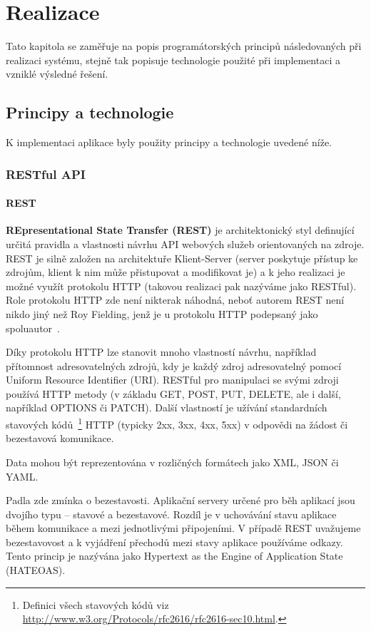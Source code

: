 \documentclass[thesis=M,czech]{FITthesis}[2014/05/07]
\begin{document}
\chapter{Realizace}
\label{chap:impl}

Tato kapitola se zaměřuje na popis programátorských principů následovaných při realizaci systému, stejně tak popisuje technologie použité při implementaci a vzniklé výsledné řešení.

\section{Principy a technologie}
\label{sec:sysanalys}

K implementaci aplikace byly použity principy a technologie uvedené níže.

\subsection{RESTful API}

\subsubsection{REST}
\textbf{REpresentational State Transfer (REST)} je architektonický styl definující určitá pravidla a vlastnosti návrhu API webových služeb orientovaných na zdroje. REST je silně založen na architektuře Klient-Server (server poskytuje přístup ke zdrojům, klient k nim může přistupovat a modifikovat je) a k jeho realizaci je možné využít protokolu HTTP (takovou realizaci pak nazýváme jako RESTful). Role protokolu HTTP zde není nikterak náhodná, neboť autorem REST není nikdo jiný než Roy Fielding, jenž je u protokolu HTTP podepsaný jako spoluautor~\cite{Fielding:2000:ASD:932295}. 

Díky protokolu HTTP lze stanovit mnoho vlastností návrhu, například přítomnost adresovatelných zdrojů, kdy je každý zdroj adresovatelný pomocí Uniform Resource Identifier (URI). RESTful pro manipulaci se svými zdroji používá HTTP metody (v základu GET, POST, PUT, DELETE, ale i další, například OPTIONS či PATCH). Další vlastností je užívání standardních stavových kódů~\footnote{Definici všech stavových kódů viz \url{http://www.w3.org/Protocols/rfc2616/rfc2616-sec10.html}.} HTTP (typicky 2xx, 3xx, 4xx, 5xx) v odpovědi na žádost či bezestavová komunikace.

Data mohou být reprezentována v rozličných formátech jako XML, JSON či YAML.

Padla zde zmínka o bezestavosti. Aplikační servery určené pro běh aplikací jsou dvojího typu – stavové a bezestavové. Rozdíl je v uchovávání stavu aplikace během komunikace a mezi jednotlivými připojeními. V případě REST uvažujeme bezestavovost a k vyjádření přechodů mezi stavy aplikace používáme odkazy. Tento princip je nazývána jako Hypertext as the Engine of Application State (HATEOAS). 
\end{document}
